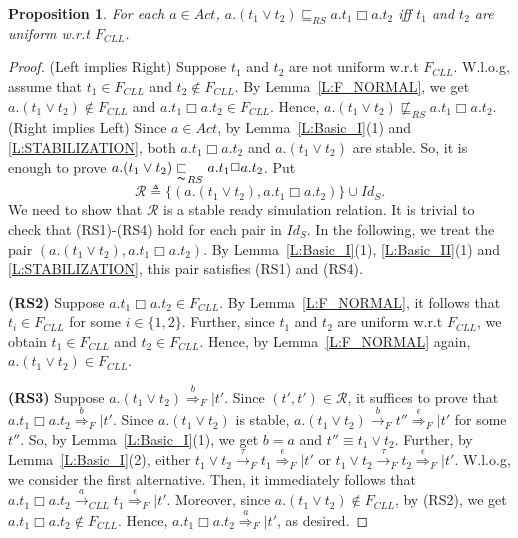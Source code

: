 \documentclass{elsarticle}
\theoremstyle{plain}
\newtheorem{proposition}[theorem]{Proposition}
\theoremstyle{definition}
\begin{document}
\begin{proposition}\label{S:SPECIAL}
For each $a \in Act$,
 $a.(t_1 \vee t_2) \sqsubseteq_{RS} a.t_1 \Box a.t_2 $ iff
 $t_1$ and $t_2$ are uniform w.r.t $F_{CLL}$.
\end{proposition}
\begin{proof}
\noindent (Left implies Right) Suppose $t_1$ and $t_2$ are not uniform w.r.t $F_{CLL}$. W.l.o.g, assume that $t_1 \in F_{CLL}$ and $t_2\notin F_{CLL}$. By Lemma~\ref{L:F_NORMAL}, we get $a.(t_1 \vee t_2) \notin F_{CLL}$ and $a.t_1 \Box a.t_2 \in F_{CLL}$. Hence, $a.(t_1 \vee t_2) \not\sqsubseteq_{RS} a.t_1 \Box a.t_2 $.\\

\noindent (Right implies Left)
Since  $a \in Act$, by Lemma~\ref{L:Basic_I}(1) and \ref{L:STABILIZATION}, both $a.t_1 \Box a.t_2 $ and $ a.(t_1 \vee t_2)$ are stable. So, it is enough to prove  $a.(t_1 \vee t_2) \underset{\thicksim}{\sqsubset}_{RS}  a.t_1 \Box a.t_2 $.
Put \[{\mathcal R}\triangleq\{(a.(t_1 \vee t_2), a.t_1 \Box a.t_2)\} \cup Id_S.\]
We need to show that $\mathcal R$ is a stable ready simulation relation.
It is trivial to check that (RS1)-(RS4) hold for each pair in $Id_S$.
In the following, we treat the pair $(a.(t_1 \vee t_2),a.t_1 \Box a.t_2)$.
By Lemma~\ref{L:Basic_I}(1), \ref{L:Basic_II}(1) and \ref{L:STABILIZATION}, this pair satisfies (RS1) and (RS4).

\textbf{(RS2)} Suppose $a.t_1 \Box a.t_2 \in F_{CLL}$. By Lemma~\ref{L:F_NORMAL}, it follows that $t_i \in F_{CLL}$ for some $i\in \{1,2\}$. Further, since $t_1$ and $t_2$ are uniform w.r.t $F_{CLL}$, we obtain $t_1 \in F_{CLL}$ and $t_2 \in F_{CLL}$. Hence, by Lemma~\ref{L:F_NORMAL} again, $a.(t_1 \vee t_2) \in F_{CLL}$.

\textbf{(RS3)} Suppose $a.(t_1 \vee t_2) \stackrel{b}{\Longrightarrow}_F|t'$. Since $(t',t')\in {\mathcal R}$, it suffices to prove that $a.t_1 \Box a.t_2 \stackrel{b}{\Longrightarrow}_F| t'$.
Since $a.(t_1 \vee t_2)$ is stable, $a.(t_1 \vee t_2) \stackrel{b}{\longrightarrow}_F t'' \stackrel{\epsilon}{\Longrightarrow}_F| t'$ for some $t''$.
So, by Lemma~\ref{L:Basic_I}(1), we get $b= a$ and $t'' \equiv t_1 \vee t_2$.
Further, by Lemma~\ref{L:Basic_I}(2), either $t_1 \vee t_2 \stackrel{\tau}{\longrightarrow}_F t_1 \stackrel{\epsilon}{\Longrightarrow}_F| t'$ or $t_1 \vee t_2 \stackrel{\tau}{\longrightarrow}_F t_2 \stackrel{\epsilon}{\Longrightarrow}_F| t'$.
W.l.o.g, we consider the first alternative.
Then, it immediately follows that $a.t_1 \Box a.t_2 \stackrel{a}{\longrightarrow}_{{CLL}} t_1  \stackrel{\epsilon}{\Longrightarrow}_F| t'$.
Moreover, since $a.(t_1 \vee t_2)\notin F_{CLL}$, by (RS2), we get $a.t_1 \Box a.t_2 \notin F_{CLL}$.
Hence, $a.t_1 \Box a.t_2 \stackrel{a}{\Longrightarrow}_F| t'$, as desired.
\end{proof}
\end{document}

